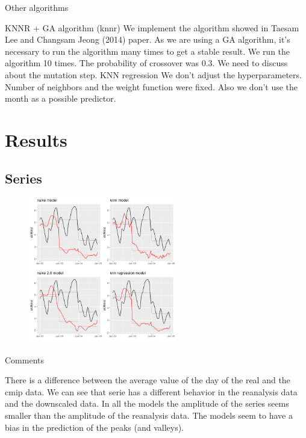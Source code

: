 \documentclass[xcolor=dvipsnames]{beamer}
\begin{document}
    \begin{frame}{Other algorithms}
        \begin{outline}
            \1 KNNR + GA algorithm (knnr)
              \2 We implement the algorithm showed in Taesam Lee and Changsam Jeong (2014) paper.
              \2 As we are using a GA algorithm, it's necessary to run the algorithm many times to get a stable result. We run the algorithm 10 times. The probability of crossover was 0.3. We need to discuss about the mutation step.
            \1 KNN regression
                \2 We don't adjust the hyperparameters. Number of neighbors and the weight function were fixed. Also we don't use the month as a possible predictor.
           \end{outline}
  
    \end{frame}

    \section{Results}

    \subsection{Series}

    \begin{frame}
        \begin{figure}
            \centering
                 \includegraphics[width=0.57\textwidth]{images/series.png}
            \label{fig:series}
        \end{figure}
    \end{frame}

    \begin{frame}{Comments}
        \begin{outline}
            \1 There is a difference between the average value of the day of the real and the cmip data.
            \1 We can see that serie has a different behavior in the reanalysis data and the downscaled data.
                \2 In all the models the amplitude of the series seems smaller than the amplitude of the reanalysis data.
                \2 The models seem to have a bias in the prediction of the peaks (and valleys).
           \end{outline}
    \end{frame}
\end{document}
